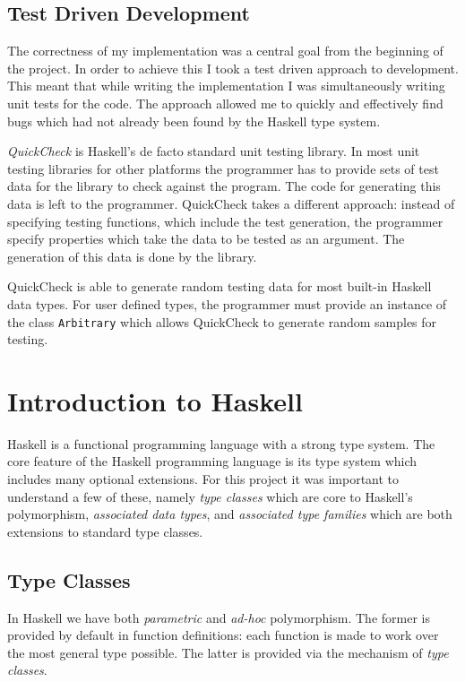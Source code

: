 \documentclass[12pt,a4paper,twoside]{scrbook}
\begin{document}
\subsection{Test Driven Development}
\label{sec:tdd}

The correctness of my implementation was a central goal from the beginning of
the project. In order to achieve this I took a test driven approach to
development. This meant that while writing the implementation I was
simultaneously writing unit tests for the code.  The approach allowed me to
quickly and effectively find bugs which had not already been found by the
Haskell type system.

\emph{QuickCheck} is Haskell's de facto standard unit testing library. In most
unit testing libraries for other platforms the programmer has to provide sets of
test data for the library to check against the program.  The code for generating
this data is left to the programmer. QuickCheck takes a different approach:
instead of specifying testing functions, which include the test generation, the
programmer specify properties which take the data to be tested as an
argument. The generation of this data is done by the library.

QuickCheck is able to generate random testing data for most built-in Haskell
data types. For user defined types, the programmer must provide an instance of
the class \texttt{Arbitrary} which allows QuickCheck to generate random samples
for testing.

\section{Introduction to Haskell}
\label{sec:haskell}

Haskell is a functional programming language with a strong type system. The core
feature of the Haskell programming language is its type system which includes
many optional extensions. For this project it was important to understand a few
of these, namely \emph{type classes} which are core to Haskell's polymorphism,
\emph{associated data types}, and \emph{associated type families} which are both
extensions to standard type classes.

\subsection{Type Classes}
\label{sec:typeclasses}

In Haskell we have both \emph{parametric} and \emph{ad-hoc} polymorphism. The
former is provided by default in function definitions: each function is made to
work over the most general type possible. The latter is provided via the
mechanism of \emph{type classes}.
\end{document}
